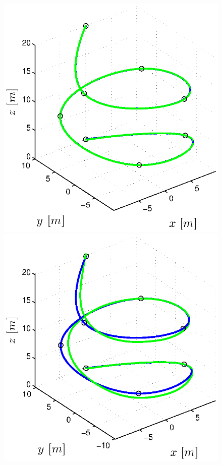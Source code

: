 \begin{figure}[H]
  \centering
  \begin{minipage}[t]{0.48\textwidth}
	\includegraphics[width=\textwidth]{graphics/trackings/figure_3D_helix_SplineDegree3_trajectoryFollowing_Disturbance_0.eps}
  \end{minipage}
  \hfill
  \begin{minipage}[t]{0.48\textwidth}
	\includegraphics[width=\textwidth]{graphics/trackings/figure_3D_helix_SplineDegree3_trajectoryFollowing_Disturbance_1.eps}

\end{minipage}
\end{figure}
